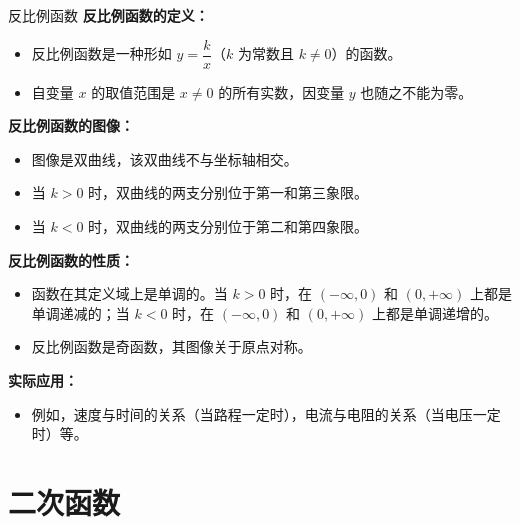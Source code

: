 \documentclass[aspectratio=169]{ctexbeamer} %
\begin{document}
\begin{frame}{反比例函数}
    \textbf{反比例函数的定义：}
    \begin{itemize}
        \item 反比例函数是一种形如 \( y = \dfrac{k}{x} \)（\( k \) 为常数且 \( k \neq 0 \)）的函数。
        \item 自变量 \( x \) 的取值范围是 \( x \neq 0 \) 的所有实数，因变量 \( y \) 也随之不能为零。
    \end{itemize}

    \vspace{0.5cm}
    \textbf{反比例函数的图像：}
    \begin{itemize}
        \item 图像是双曲线，该双曲线不与坐标轴相交。
        \item 当 \( k > 0 \) 时，双曲线的两支分别位于第一和第三象限。
        \item 当 \( k < 0 \) 时，双曲线的两支分别位于第二和第四象限。
    \end{itemize}

    \vspace{0.5cm}
    \textbf{反比例函数的性质：}
    \begin{itemize}
        \item 函数在其定义域上是单调的。当 \( k > 0 \) 时，在 \( (-\infty, 0) \) 和 \( (0, +\infty) \) 上都是单调递减的；当 \( k < 0 \) 时，在 \( (-\infty, 0) \) 和 \( (0, +\infty) \) 上都是单调递增的。
        \item 反比例函数是奇函数，其图像关于原点对称。
    \end{itemize}

    \vspace{0.5cm}
    \textbf{实际应用：}
    \begin{itemize}
        \item 例如，速度与时间的关系（当路程一定时），电流与电阻的关系（当电压一定时）等。
    \end{itemize}
\end{frame}

\section{二次函数}
\end{document}
